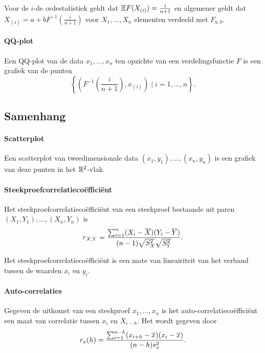 Voor de \(i\)-de ordestatistiek geldt dat \(\mathbb{E} F(X_{(i)})=\frac{i}{n+1}\) en algemener geldt dat \(X_{(i)}=a+bF^{-1}\left(\frac{i}{n+1}\right)\) voor \(X_{1},\dots,X_{n}\) elementen verdeeld met \(F_{a,b}\).

\paragraph{QQ-plot} Een QQ-plot van de data \(x_{1},\dots,x_{n}\) ten opzichte van een verdelingsfunctie \(F\) is een grafiek van de punten
\[
    \left\{\left(F^{-1}\left(\frac{i}{n+1}\right),x_{(i)}\right)\mid i=1,\dots,n\right\}.
\]

\subsection{Samenhang}
\paragraph{Scatterplot} Een scatterplot van tweedimensionale data \((x_{1},y_{1}),\dots,(x_{n},y_{n})\) is een grafiek van deze punten in het \(\mathbb{R}^{2}\)-vlak.

\paragraph{Steekproefcorrelatiecoëfficiënt} Het steekproefcorrelatiecoëfficiënt van een steekproef bestaande uit paren \((X_{1},Y_{1}),\dots,(X_{n},Y_{n})\) is
\[
    r_{X,Y}=\frac{\sum_{i=1}^{n}(X_{i}-\overline{X})(Y_{i}-\overline{Y})}{(n-1)\sqrt{S_{X}^{2}}\sqrt{S_{Y}^{2}}}.
\]

Het steekproefcorrelatiecoëfficiënt is een mate van lineairiteit van het verband tussen de waarden \(x_{i}\) en \(y_{i}\).

\paragraph{Auto-correlaties} Gegeven de uitkomst van een steekproef \(x_{1},\dots,x_{n}\) is het auto-correlatiecoëfficiënt een maat van correlatie tussen \(x_{i}\) en \(X_{i-h}\). Het wordt gegeven door
\[
    r_{x}(h)=\frac{\sum_{i=1}^{n-h}(x_{i+h}-\overline{x})(x_{i}-\overline{x})}{(n-h)s_{x}^{2}}.
\]